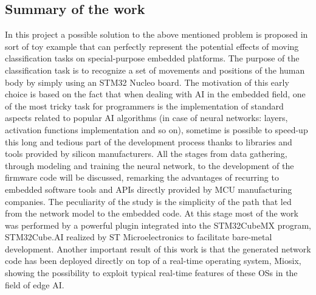 \subsection{Summary of the work}
In this project a possible solution to the above mentioned problem is proposed in sort of toy example that can perfectly represent the potential effects of moving classification tasks on special-purpose embedded platforms. The purpose of the classification task is to recognize a set of movements and positions of the human body by simply using an STM32 Nucleo board. The motivation of this early choice is based on the fact that when dealing with AI in the embedded field, one of the most tricky task for programmers is the implementation of standard aspects related to popular AI algorithms (in case of neural networks: layers, activation functions implementation and so on), sometime is possible to speed-up this long and tedious part of the development process thanks to libraries and tools provided by silicon manufacturers. All the stages from data gathering, through modeling and training the neural network, to the development of the firmware code will be discussed, remarking the advantages of recurring to embedded software tools and APIs directly provided by MCU manufacturing companies. The peculiarity of the study is the simplicity of the path that led from the network model to the embedded code. At this stage most of the work was performed by a powerful plugin integrated into the STM32CubeMX program, STM32Cube.AI realized by ST Microelectronics to facilitate bare-metal development. Another important result of this work is that the generated network code has been deployed directly on top of a real-time operating system, Miosix, showing the possibility to exploit typical real-time features of these OSs in the field of edge AI.   
\pagebreak

